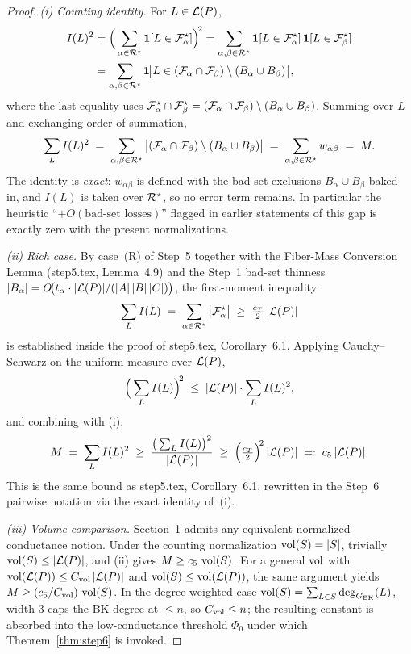 \begin{proof}
\emph{(i) Counting identity.} For $L\in\mathcal{L}(P)$,
\begin{align*}
I(L)^2
 &=\Big(\sum_{\alpha\in\mathcal{R}^\star}\mathbf{1}[L\in\mathcal{F}_{\alpha}^\star]\Big)^{\!2}
  =\sum_{\alpha,\beta\in\mathcal{R}^\star}
        \mathbf{1}[L\in\mathcal{F}_{\alpha}^\star]\,
        \mathbf{1}[L\in\mathcal{F}_{\beta}^\star]\\
 &=\sum_{\alpha,\beta\in\mathcal{R}^\star}
      \mathbf{1}\!\big[L\in(\mathcal{F}_{\alpha}\cap\mathcal{F}_{\beta})
                               \setminus(B_\alpha\cup B_\beta)\big],
\end{align*}
where the last equality uses
$\mathcal{F}_{\alpha}^\star\cap\mathcal{F}_{\beta}^\star
 =(\mathcal{F}_{\alpha}\cap\mathcal{F}_{\beta})\setminus(B_\alpha\cup B_\beta)$.
Summing over $L$ and exchanging order of summation,
\[
\sum_L I(L)^2
 \;=\;\sum_{\alpha,\beta\in\mathcal{R}^\star}
        \big|(\mathcal{F}_{\alpha}\cap\mathcal{F}_{\beta})
               \setminus(B_\alpha\cup B_\beta)\big|
 \;=\;\sum_{\alpha,\beta\in\mathcal{R}^\star} w_{\alpha\beta}
 \;=\; M.
\]
The identity is \emph{exact}: $w_{\alpha\beta}$ is defined with the
bad-set exclusions $B_\alpha\cup B_\beta$ baked in, and $I(L)$ is
taken over $\mathcal{R}^\star$, so no error term remains. In particular the
heuristic ``$+O(\text{bad-set losses})$'' flagged in earlier statements
of this gap is exactly zero with the present normalizations.

\smallskip
\emph{(ii) Rich case.}
By case~(R) of Step~5 together with the Fiber-Mass Conversion Lemma
(step5.tex, Lemma~4.9) and the Step~1 bad-set thinness
$|B_\alpha|=O\!\big(t_\alpha\cdot|\mathcal{L}(P)|/(|A|\,|B|\,|C|)\big)$,
the first-moment inequality
\[
\sum_L I(L)
 \;=\;\sum_{\alpha\in\mathcal{R}^\star}\big|\mathcal{F}_{\alpha}^\star\big|
 \;\ge\; \tfrac{c_T}{2}\,|\mathcal{L}(P)|
\]
is established inside the proof of step5.tex, Corollary~6.1. Applying
Cauchy--Schwarz on the uniform measure over $\mathcal{L}(P)$,
\[
\Big(\sum_L I(L)\Big)^{\!2}
 \;\le\; |\mathcal{L}(P)|\cdot\sum_L I(L)^2,
\]
and combining with (i),
\[
M \;=\;\sum_L I(L)^2
 \;\ge\;\frac{\big(\sum_L I(L)\big)^2}{|\mathcal{L}(P)|}
 \;\ge\;\Big(\tfrac{c_T}{2}\Big)^{\!2}\,|\mathcal{L}(P)|
 \;=:\; c_5\,|\mathcal{L}(P)|.
\]
This is the same bound as step5.tex, Corollary~6.1, rewritten in the
Step~6 pairwise notation via the exact identity of~(i).

\smallskip
\emph{(iii) Volume comparison.}
Section~1 admits any equivalent normalized-conductance notion. Under
the counting normalization $\operatorname{vol}(S)=|S|$, trivially
$\operatorname{vol}(S)\le|\mathcal{L}(P)|$, and (ii) gives $M\ge c_5\,\operatorname{vol}(S)$. For a
general $\operatorname{vol}$ with $\operatorname{vol}(\mathcal{L}(P))\le C_{\operatorname{vol}}\,|\mathcal{L}(P)|$ and
$\operatorname{vol}(S)\le\operatorname{vol}(\mathcal{L}(P))$, the same argument yields
$M\ge (c_5/C_{\operatorname{vol}})\,\operatorname{vol}(S)$. In the degree-weighted case
$\operatorname{vol}(S)=\sum_{L\in S}\deg_{G_{\mathrm{BK}}}(L)$, width-$3$ caps the BK-degree
at $\le n$, so $C_{\operatorname{vol}}\le n$; the resulting constant is absorbed into
the low-conductance threshold $\Phi_0$ under which
Theorem~\ref{thm:step6} is invoked.
\end{proof}

